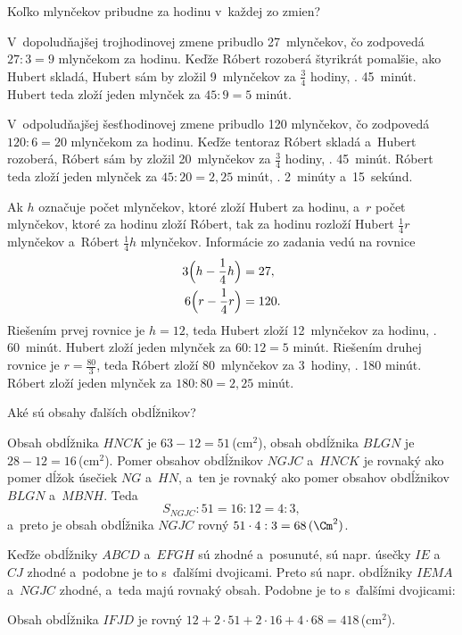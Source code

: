 {%
\napad
Koľko mlynčekov pribudne za hodinu v~každej zo zmien?

\riesenie
V~dopoludňajšej trojhodinovej zmene pribudlo 27~mlynčekov, čo zodpovedá ${27:3}=9$ mlynčekom za hodinu.
Keďže Róbert rozoberá štyrikrát pomalšie, ako Hubert skladá, Hubert sám by zložil 9~mlynčekov za $\frac34$ hodiny, \tj. 45~minút.
Hubert teda zloží jeden mlynček za $45:9=5$ minút.

V~odpoludňajšej šesťhodinovej zmene pribudlo 120 mlynčekov, čo zodpovedá ${120:6}=20$ mlynčekom za hodinu.
Keďže tentoraz Róbert skladá a~Hubert rozoberá, Róbert sám by zložil 20~mlynčekov za $\frac34$ hodiny, \tj. 45~minút.
Róbert teda zloží jeden mlynček za $45:20=2{,}25$ minút, \tj. 2~minúty a~15~sekúnd.

\ineriesenie
Ak $h$ označuje počet mlynčekov, ktoré zloží Hubert za hodinu, a~$r$ počet mlynčekov, ktoré za hodinu zloží Róbert, tak za hodinu rozloží Hubert $\frac14r$ mlynčekov a~Róbert $\frac14h$ mlynčekov.
Informácie zo zadania vedú na rovnice
$$
\aligned
3\Big( h-\frac14h \Big) &=27, \\
6\Big( r-\frac14r \Big) &=120.
\endaligned
$$
Riešením prvej rovnice je $h=12$, teda Hubert zloží 12~mlynčekov za hodinu,
\tj. 60~minút.
Hubert zloží jeden mlynček za $60:12=5$ minút.
Riešením druhej rovnice je $r=\frac{80}3$, teda Róbert zloží
80~mlynčekov za 3~hodiny, \tj. 180 minút.
Róbert zloží jeden mlynček za $180:80=2{,}25$ minút.
}

{%
\napad
Aké sú obsahy ďalších obdĺžnikov?

\riesenie
Obsah obdĺžnika $HNCK$ je $63-12=51$\,(cm$^2$), obsah obdĺžnika $BLGN$ je $28-12=16$\,(cm$^2$).
Pomer obsahov obdĺžnikov $NGJC$ a~$HNCK$ je rovnaký ako pomer dĺžok úsečiek $NG$ a~$HN$, a~ten je rovnaký ako pomer obsahov obdĺžnikov $BLGN$ a~$MBNH$.
Teda
$$
S_{NGJC}:51=16:12=4:3,
$$
a~preto je obsah obdĺžnika $NGJC$ rovný
$51\cdot4:3=68\,(\Cm^2)$.

Keďže obdĺžniky $ABCD$ a~$EFGH$ sú zhodné a~posunuté, sú napr. úsečky $IE$ a~$CJ$ zhodné a~podobne je to s~ďalšími dvojicami.
Preto sú napr. obdĺžniky $IEMA$ a~$NGJC$ zhodné, a~teda majú rovnaký obsah.
Podobne je to s~ďalšími dvojicami:
%


Obsah obdĺžnika $IFJD$ je rovný $12+2\cdot51+2\cdot16+4\cdot68=418$\,(cm$^2$).
}

